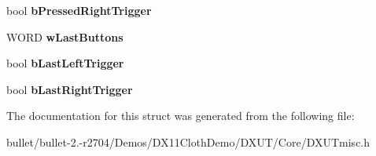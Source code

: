 \begin{DoxyCompactItemize}
\item 
\hypertarget{struct_d_x_u_t___g_a_m_e_p_a_d_a8e377960f2420151bc8f5adda799a6c3}{bool {\bfseries b\+Pressed\+Right\+Trigger}}\label{struct_d_x_u_t___g_a_m_e_p_a_d_a8e377960f2420151bc8f5adda799a6c3}

\item 
\hypertarget{struct_d_x_u_t___g_a_m_e_p_a_d_ad817873373a29226784fe4ed7c4f4cb9}{W\+O\+R\+D {\bfseries w\+Last\+Buttons}}\label{struct_d_x_u_t___g_a_m_e_p_a_d_ad817873373a29226784fe4ed7c4f4cb9}

\item 
\hypertarget{struct_d_x_u_t___g_a_m_e_p_a_d_af2aa7513882a92c0c66b74f786b8cc52}{bool {\bfseries b\+Last\+Left\+Trigger}}\label{struct_d_x_u_t___g_a_m_e_p_a_d_af2aa7513882a92c0c66b74f786b8cc52}

\item 
\hypertarget{struct_d_x_u_t___g_a_m_e_p_a_d_af3ac25270da6d465e568b8f35cbb7c16}{bool {\bfseries b\+Last\+Right\+Trigger}}\label{struct_d_x_u_t___g_a_m_e_p_a_d_af3ac25270da6d465e568b8f35cbb7c16}

\end{DoxyCompactItemize}


The documentation for this struct was generated from the following file\+:\begin{DoxyCompactItemize}
\item 
bullet/bullet-\/2.-\/r2704/\+Demos/\+D\+X11\+Cloth\+Demo/\+D\+X\+U\+T/\+Core/D\+X\+U\+Tmisc.\+h\end{DoxyCompactItemize}
